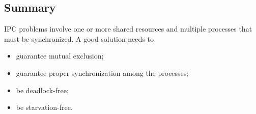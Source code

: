 \subsection{Summary}

\begin{keypoint}
  IPC problems involve one or more shared resources and multiple processes that must be synchronized. A good solution needs to
  \begin{itemize}
    \item guarantee mutual exclusion;
    \item guarantee proper synchronization among the processes;
    \item be deadlock-free;
    \item be starvation-free.
  \end{itemize}
\end{keypoint}
